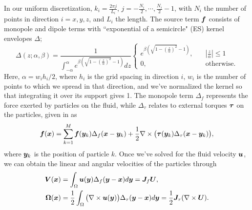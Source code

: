 In our uniform discretization, $k_i = \frac{2\pi j}{L_i}$, $j = -\frac{N_i}{2},\cdots, \frac{N_i}{2}-1$, with $N_i$ the number of points in direction $i=x,y,z$, and $L_i$ the length. The source term $\boldsymbol f$ consists of monopole and dipole terms with ``exponential of a semicircle" (ES) kernel \cite{barnett} envelopes $\Delta$;
\begin{equation}
\Delta(z;\alpha,\beta) = \displaystyle \frac{1}{\displaystyle \int_{-\alpha}^\alpha e^{\beta(\sqrt{1-(\frac{z}{\alpha})^2}-1)}dz} \begin{cases}
e^{\beta(\sqrt{1-(\frac{z}{\alpha})^2}-1)},\quad &|\frac{z}{\alpha}| \leq 1\\
0,\quad &\text{otherwise}.
\end{cases}
\end{equation}
Here, $\alpha = w_ih_i/2$, where $h_i$ is the grid spacing in direction $i$, $w_i$ is the number of points to which we spread in that direction, and we've normalized the kernel so that integrating it over its support gives 1. The monopole term $\Delta_f$ represents the force exerted by particles on the fluid, while $\Delta_\tau$ relates to external torques $\boldsymbol \tau$ on the particles, given in \cite{lomholt} as
\begin{equation}\label{fcm}
\boldsymbol f(\boldsymbol x) = \displaystyle \sum_{k=1}^M \boldsymbol f(\boldsymbol y_k)\Delta_f(\boldsymbol x - \boldsymbol y_k) +\frac{1}{2}\nabla \times  \big(\boldsymbol{\tau}(\boldsymbol y_k)\Delta_\tau(\boldsymbol x - \boldsymbol y_k)\big) ,
\end{equation}
where $\boldsymbol y_k$ is the position of particle $k$. Once we've solved for the fluid velocity $\boldsymbol u$, we can obtain the linear and angular velocities of the particles through
\begin{align}
\boldsymbol V(\boldsymbol x) &= \displaystyle \int_\Omega \boldsymbol u(\boldsymbol y) \Delta_f(\boldsymbol y - \boldsymbol x)d\boldsymbol y = \boldsymbol J_f\boldsymbol U,\label{getpartvels}\\
\boldsymbol \Omega(\boldsymbol x) &= \frac{1}{2}\displaystyle \int_\Omega \big(\nabla \times \boldsymbol u(\boldsymbol y)\big) \Delta_\tau(\boldsymbol y - \boldsymbol x)d\boldsymbol y = \frac{1}{2}\boldsymbol J_\tau(\nabla \times \boldsymbol U)\label{getpartvort}.
\end{align}

